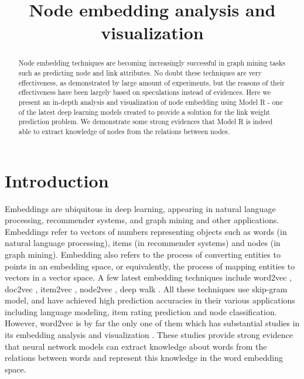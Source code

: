 \documentclass[conference]{IEEEtran}
\begin{document}
\title{Node embedding analysis and visualization}
\author{
	\and
}
\maketitle

\begin{abstract}
	Node embedding techniques are becoming increasingly successful in
	graph mining tasks such as predicting node and link attributes.
	No doubt these techniques are very effectiveness,
	as demonstrated by large amount of experiments,
	but the reasons of their effectiveness have been largely based on
	speculations instead of evidences.
	Here we present an in-depth analysis and visualization of node embedding using Model R - one of the latest deep learning models created to provide a 
	solution for the link weight prediction problem.
	We demonstrate some strong evidences that Model R is indeed able to extract knowledge of nodes from the relations between nodes.
\end{abstract}
	
\section{Introduction}
Embeddings are ubiquitous in deep learning, appearing in natural language processing, recommender systems, and graph mining and other applications.
Embeddings refer to vectors of numbers representing objects such as
words (in natural language processing),
items (in recommender systems) and
nodes (in graph mining).
Embedding also refers to
the process of converting entities to points in an embedding space,
or equivalently,
the process of mapping entities to vectors in a vector space.
A few latest embedding techniques include
word2vec \cite{mikolov2013efficient},
doc2vec \cite{le2014distributed},
item2vec \cite{barkan2016item2vec},
node2vec \cite{grovernode2vec},
deep walk \cite{perozzi2014deepwalk}.
All these techniques use skip-gram model,
and have achieved high prediction accuracies
in their various applications including
language modeling,
item rating prediction and
node classification.
However, word2vec is by far the only one of them which has substantial studies
in its embedding analysis and visualization \cite{mikolov2013distributed}.
These studies provide strong evidence that
neural network models can extract knowledge about words from
the relations between words and
represent this knowledge in the word embedding space.
\end{document}
